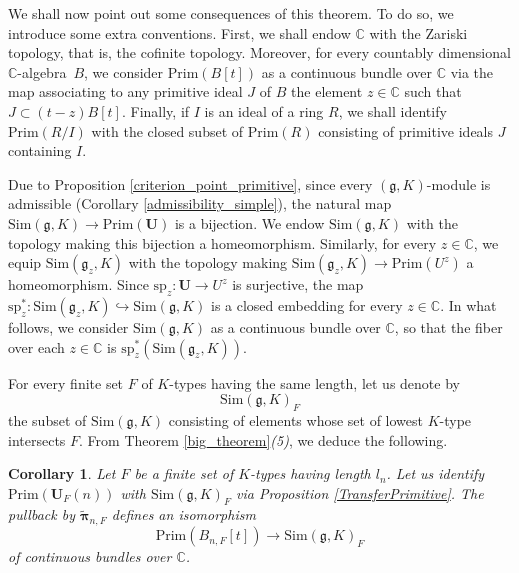 \documentclass{amsart}
\newtheorem{corollary}[theorem]{Corollary}
\theoremstyle{definition}
\begin{document}
We shall now point out some consequences of this theorem. To do so, we introduce some extra conventions. First, we shall endow $\mathbb{C}$ with the Zariski topology, that is, the cofinite topology. Moreover, for every countably dimensional $\mathbb{C}$-algebra~$B$, we consider $\mathrm{Prim}(B[t])$ as a continuous bundle over $\mathbb{C}$ via the map associating to any primitive ideal $J$ of $B$ the element $z \in \mathbb{C}$ such that $J \subset (t-z)B[t]$. Finally, if $I$ is an ideal of a ring $R$, we shall identify $\mathrm{Prim}(R/I)$ with the closed subset of $\mathrm{Prim}(R)$ consisting of primitive ideals $J$ containing $I$.

Due to Proposition \ref{criterion_point_primitive}, since every $(\bm{\mathfrak{g}},K)$-module is admissible (Corollary \ref{admissibility_simple}), the natural map $\mathrm{Sim}(\bm{\mathfrak{g}},K) \to \mathrm{Prim}(\bm{U})$ is a bijection. We endow $\mathrm{Sim}(\bm{\mathfrak{g}},K)$ with the topology making this bijection a homeomorphism. Similarly, for every $z \in \mathbb{C}$, we equip $\mathrm{Sim}(\bm{\mathfrak{g}}_z,K)$ with the topology making $\mathrm{Sim}(\bm{\mathfrak{g}}_z,K) \to \mathrm{Prim}(U^z)$ a homeomorphism. Since $\mathrm{sp}_z : \bm{U} \to U^z$ is surjective, the map $\mathrm{sp}_z^* : \mathrm{Sim}(\bm{\mathfrak{g}}_z,K) \hookrightarrow \mathrm{Sim}(\bm{\mathfrak{g}},K)$ is a closed embedding for every $z \in \mathbb{C}$. In what follows, we consider $\mathrm{Sim}(\bm{\mathfrak{g}},K)$ as a continuous bundle over $\mathbb{C}$, so that the fiber over each $z \in \mathbb{C}$ is $\mathrm{sp}_z^*(\mathrm{Sim}(\bm{\mathfrak{g}}_z,K))$.

For every finite set $F$ of $K$-types having the same length, let us denote by \[\mathrm{Sim}(\bm{\mathfrak{g}},K)_{F}\] the subset of $\mathrm{Sim}(\bm{\mathfrak{g}},K)$ consisting of elements whose set of lowest $K$-type intersects $F$. From Theorem \ref{big_theorem}\textit{(5)}, we deduce the following.

\begin{corollary}\label{remark_transfer_primitive}
     Let $F$ be a finite set of $K$-types having length $l_n$. Let us identify $\mathrm{Prim}(\bm{U}_F(n))$ with $\mathrm{Sim}(\bm{\mathfrak{g}},K)_{F}$ via Proposition \ref{TransferPrimitive}. The pullback by $\tilde{\bm{\pi}}_{n,F}$ defines an isomorphism \[\mathrm{Prim}(B_{n,F}[t]) \to \mathrm{Sim}(\bm{\mathfrak{g}},K)_{F}\] of continuous bundles over $\mathbb{C}$.
\end{corollary}
\end{document}
